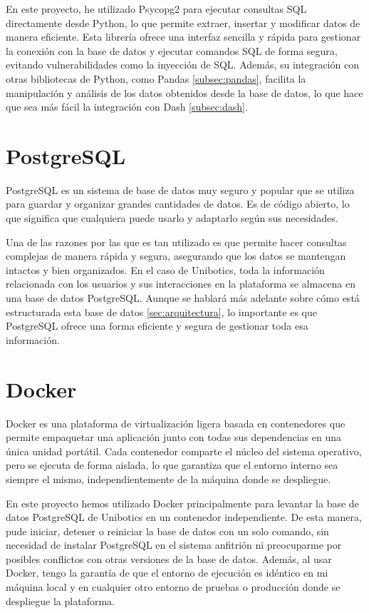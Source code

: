 \documentclass[a4paper, 12pt]{book}
\begin{document}
En este proyecto, he utilizado Psycopg2 para ejecutar consultas SQL directamente desde Python, lo que permite extraer, insertar y modificar datos de manera eficiente. Esta librería ofrece una interfaz sencilla y rápida para gestionar la conexión con la base de datos y ejecutar comandos SQL de forma segura, evitando vulnerabilidades como la inyección de SQL. Además, su integración con otras bibliotecas de Python, como Pandas \ref{subsec:pandas}, facilita la manipulación y análisis de los datos obtenidos desde la base de datos, lo que hace que sea más fácil la integración con Dash \ref{subsec:dash}.


\section{PostgreSQL}
\label{sec:PostgreSQL}
PostgreSQL es un sistema de base de datos muy seguro y popular que se utiliza para guardar y organizar grandes cantidades de datos. Es de código abierto, lo que significa que cualquiera puede usarlo y adaptarlo según sus necesidades. 

Una de las razones por las que es tan utilizado es que permite hacer consultas complejas de manera rápida y segura, asegurando que los datos se mantengan intactos y bien organizados. En el caso de Unibotics, toda la información relacionada con los usuarios y sus interacciones en la plataforma se almacena en una base de datos PostgreSQL. Aunque se hablará más adelante sobre cómo está estructurada esta base de datos \ref{sec:arquitectura}, lo importante es que PostgreSQL ofrece una forma eficiente y segura de gestionar toda esa información.

\section{Docker}
\label{sec:docker}

Docker es una plataforma de virtualización ligera basada en contenedores que permite empaquetar una aplicación junto con todas sus dependencias en una única unidad portátil. Cada contenedor comparte el núcleo del sistema operativo, pero se ejecuta de forma aislada, lo que garantiza que el entorno interno sea siempre el mismo, independientemente de la máquina donde se despliegue.

En este proyecto hemos utilizado Docker principalmente para levantar la base de datos PostgreSQL de Unibotics en un contenedor independiente. De esta manera, pude iniciar, detener o reiniciar la base de datos con un solo comando, sin necesidad de instalar PostgreSQL en el sistema anfitrión ni preocuparme por posibles conflictos con otras versiones de la base de datos. Además, al usar Docker, tengo la garantía de que el entorno de ejecución es idéntico en mi máquina local y en cualquier otro entorno de pruebas o producción donde se despliegue la plataforma.
\end{document}
